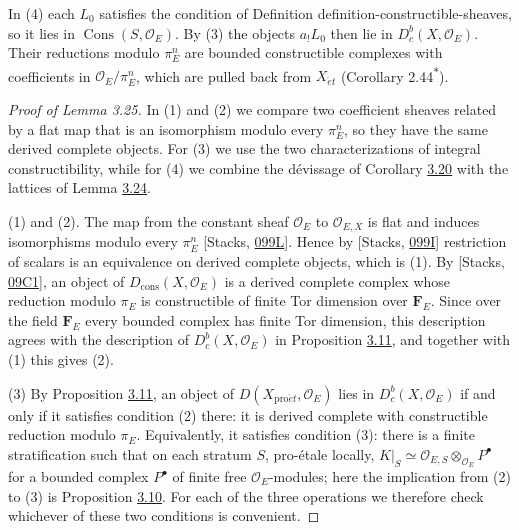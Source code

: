 \documentclass[11pt]{article}
\newcommand{\bpout}[1]{#1\textsuperscript{\hyperlink{bp-outside}{\ensuremath{\ast}}}}
\providecommand{\Cons}{}\renewcommand{\Cons}{\operatorname{Cons}}
\providecommand{\Dbc}{}\renewcommand{\Dbc}{D^b_c}
\providecommand{\Dc}{}\renewcommand{\Dc}{D_{\mathrm{cons}}}
\begin{document}
\label{bp83}%
In (4) each \(L_0\) satisfies the condition of Definition definition-constructible-sheaves, so it lies in \(\Cons(S,\mathcal O_E)\). By (3) the objects \(a_!L_0\) then lie in \(\Dbc(X,\mathcal O_E)\). Their reductions modulo \(\pi_E^n\) are bounded constructible complexes with coefficients in \(\mathcal O_E/\pi_E^n\), which are pulled back from \(X_{\acute{e}t}\) (Corollary \bpout{2.44}).

\begin{proof}[{Proof of Lemma 3.25}]\label{bp84}%
In (1) and (2) we compare two coefficient sheaves related by a flat map that is an isomorphism modulo every \(\pi_E^n\), so they have the same derived complete objects. For (3) we use the two characterizations of integral constructibility, while for (4) we combine the dévissage of Corollary \hyperref[bp61]{3.20} with the lattices of Lemma \hyperref[bp77]{3.24}.

(1) and (2). The map from the constant sheaf \(\mathcal O_E\) to \(\mathcal O_{E,X}\) is flat and induces isomorphisms modulo every \(\pi_E^n\) [Stacks, \href{https://stacks.math.columbia.edu/tag/099L}{099L}]. Hence by [Stacks, \href{https://stacks.math.columbia.edu/tag/099I}{099I}] restriction of scalars is an equivalence on derived complete objects, which is (1). By [Stacks, \href{https://stacks.math.columbia.edu/tag/09C1}{09C1}], an object of \(\Dc(X,\mathcal O_E)\) is a derived complete complex whose reduction modulo \(\pi_E\) is constructible of finite Tor dimension over \(\mathbf F_E\). Since over the field \(\mathbf F_E\) every bounded complex has finite Tor dimension, this description agrees with the description of \(\Dbc(X,\mathcal O_E)\) in Proposition \hyperref[bp34]{3.11}, and together with (1) this gives (2).

(3) By Proposition \hyperref[bp34]{3.11}, an object of \(D(X_{\mathrm{pro}\acute{e}t},\mathcal O_E)\) lies in \(\Dbc(X,\mathcal O_E)\) if and only if it satisfies condition (2) there: it is derived complete with constructible reduction modulo \(\pi_E\). Equivalently, it satisfies condition (3): there is a finite stratification such that on each stratum \(S\), pro-étale locally, \(K|_S\simeq\mathcal O_{E,S}\otimes_{\mathcal O_E}P^\bullet\) for a bounded complex \(P^\bullet\) of finite free \(\mathcal O_E\)-modules; here the implication from (2) to (3) is Proposition \hyperref[bp31]{3.10}. For each of the three operations we therefore check whichever of these two conditions is convenient.


\end{proof}
\end{document}
